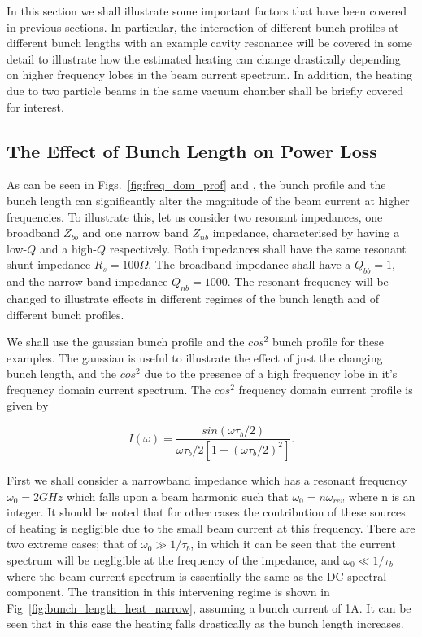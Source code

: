 \documentclass[12pt,a4paper,twopage,openright]{report}
\begin{document}
In this section we shall illustrate some important factors that have been covered in previous sections. In particular, the interaction of different bunch profiles at different bunch lengths with an example cavity resonance will be covered in some detail to illustrate how the estimated heating can change drastically depending on higher frequency lobes in the beam current spectrum. In addition, the heating due to two particle beams in the same vacuum chamber shall be briefly covered for interest.

\subsection{The Effect of Bunch Length on Power Loss}

As can be seen in Figs.~\ref{fig:freq_dom_prof} and \label{fig:diff_bunch_len_para}, the bunch profile and the bunch length can significantly alter the magnitude of the beam current at higher frequencies. To illustrate this, let us consider two resonant impedances, one broadband $Z_{bb}$ and one narrow band $Z_{nb}$ impedance, characterised by having a low-$Q$ and a high-$Q$ respectively. Both impedances shall have the same resonant shunt impedance $R_{s} = 100\Omega$. The broadband impedance shall have a $Q_{bb}=1$, and the narrow band impedance $Q_{nb}=1000$. The resonant frequency will be changed to illustrate effects in different regimes of the bunch length and of different bunch profiles.

We shall use the gaussian bunch profile and the $cos^{2}$ bunch profile for these examples. The gaussian is useful to illustrate the effect of just the changing bunch length, and the $cos^{2}$ due to the presence of a high frequency lobe in it's frequency domain current spectrum. The $cos^{2}$ frequency domain current profile is given by

\begin{equation}
I \left( \omega \right) = \frac{sin \left( \omega \tau_{b}/2 \right)}{ \omega \tau_{b}/2 \left[ 1 - \left(  \omega \tau_{b}/2 \right)^{2}  \right]}.
\end{equation}

First we shall consider a narrowband impedance which has a resonant frequency $\omega_{0} =2GHz$ which falls upon a beam harmonic such that $\omega_{0}=n\omega_{rev}$ where n is an integer. It should be noted that for other cases the contribution of these sources of heating is negligible due to the small beam current at this frequency. There are two extreme cases; that of  $\omega_{0} \gg 1/\tau_{b}$, in which it can be seen that the current spectrum will be negligible at the frequency of the impedance, and $\omega_{0} \ll 1/\tau_{b}$ where the beam current spectrum is essentially the same as the DC spectral component. The transition in this intervening regime is shown in Fig~\ref{fig:bunch_length_heat_narrow}, assuming a bunch current of 1A. It can be seen that in this case the heating falls drastically as the bunch length increases.
\end{document}
